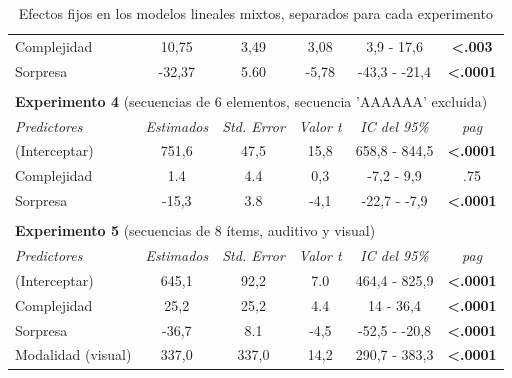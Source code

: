 \begin{table}[]
\begin{tabular}{lccccc}
Complejidad          & 10,75        & 3,49         & 3,08         & 3,9 - 17,6      & \textbf{\textless{}.003} \\
Sorpresa           & -32,37        & 5.60         & -5,78        & -43,3 - -21,4    & \textbf{\textless{}.0001} \\ \hline
\multicolumn{1}{c}{\textbf{}} & \multicolumn{1}{l}{} & \multicolumn{1}{l}{} & \multicolumn{1}{l}{} & \multicolumn{1}{l}{} & \multicolumn{1}{l}{}   \\
\multicolumn{6}{l}{\textbf{Experimento 4} (secuencias de 6 elementos, secuencia 'AAAAAA' excluida)}                          \\ \hline
\textit{Predictores}     & \textit{Estimados}  & \textit{Std. Error} & \textit{Valor t}   & \textit{IC del 95\%} & \textit{pag}       \\ \hline
(Interceptar)         & 751,6        & 47,5         & 15,8         & 658,8 - 844,5    & \textbf{\textless{}.0001} \\
Complejidad          & 1.4         & 4.4         & 0,3         & -7,2 - 9,9      &.75            \\
Sorpresa           & -15,3        & 3.8         & -4,1         & -22,7 - -7,9     & \textbf{\textless{}.0001} \\ \hline
\multicolumn{1}{c}{\textbf{}} & \multicolumn{1}{l}{} & \multicolumn{1}{l}{} & \multicolumn{1}{l}{} & \multicolumn{1}{l}{} & \multicolumn{1}{l}{}   \\
\multicolumn{6}{l}{\textbf{Experimento 5} (secuencias de 8 ítems, auditivo y visual)}                                 \\ \hline
\textit{Predictores}     & \textit{Estimados}  & \textit{Std. Error} & \textit{Valor t}   & \textit{IC del 95\%} & \textit{pag}       \\ \hline
(Interceptar)         & 645,1        & 92,2         & 7.0         & 464,4 - 825,9    & \textbf{\textless{}.0001} \\
Complejidad          & 25,2         & 25,2         & 4.4         & 14 - 36,4      & \textbf{\textless{}.0001} \\
Sorpresa           & -36,7        & 8.1         & -4,5         & -52,5 - -20,8    & \textbf{\textless{}.0001} \\
Modalidad (visual)      & 337,0        & 337,0        & 14,2         & 290,7 - 383,3    & \textbf{\textless{}.0001} \\ \hline
\end{tabular}
\caption{Efectos fijos en los modelos lineales mixtos, separados para cada experimento}
\label{PlosBIO-T1}
\end{table}

